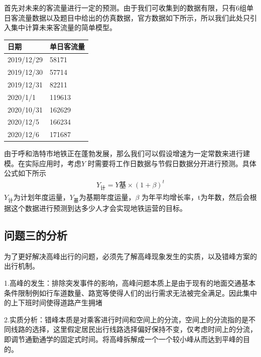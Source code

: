 \documentclass[12pt,a4paper]{mcmthesis}
\begin{document}
    首先对未来的客流量进行一定的预测。由于我们可收集到的数据有限，只有6组单日客流量数据以及题目中给出的仿真数据，官方数据如下所示，所以我们此处只引入集中计算未来客流量的简单模型。
    \begin{table}
        \centering
        \begin{tabular}{|l|l|}
            \hline
            日期         & 单日客流量  \\ \hline
            2019/12/29 & 58171  \\ \hline
            2019/12/30 & 57714  \\ \hline
            2019/12/31 & 82211  \\ \hline
            2020/1/1   & 119613 \\ \hline
            2020/10/31 & 162629 \\ \hline
            2020/12/5  & 166234 \\ \hline
            2020/12/6  & 171687 \\ \hline
        \end{tabular}
    \end{table}
    由于呼和浩特市地铁正在蓬勃发展，那么我们可以假设增速为一定常数来进行建模。在实际应用时，考虑$Y$ 时需要将工作日数据与节假日数据分开进行预测。具体公式如下所示
    \begin{equation}
        \begin{aligned}
            Y_{计}=Y{基} \times (1+\beta)^t
        \end{aligned}
    \end{equation}
    $Y_{计}$为计划年度运量，$Y_{基}$为基期年度运量，$\beta$ 为年平均增长率，t为年数，然后会根据这个数据进行预测到达多少人才会实现地铁运营的目标。

    \subsection{问题三的分析}

    为了更好解决高峰出行的问题，必须先了解高峰现象发生的实质，以及错峰方案的出行机制。

    1.高峰的发生：排除突发事件的影响，高峰问题本质上是由于现有的地面交通基本条件限制例如行车道数量、路宽等使得人们的出行需求无法被完全满足。因此集中的上下班时间使得道路产生拥堵

    2.实质分析：错峰本质是对乘客进行时间和空间上的分流，空间上的分流指的是不同线路的选择，这里假定居民出行线路选择偏好保持不变，仅考虑时间上的分流，即调节通勤通学的固定式时间。将高峰拆解成一个一个较小峰从而达到平峰的目的。
\end{document}
